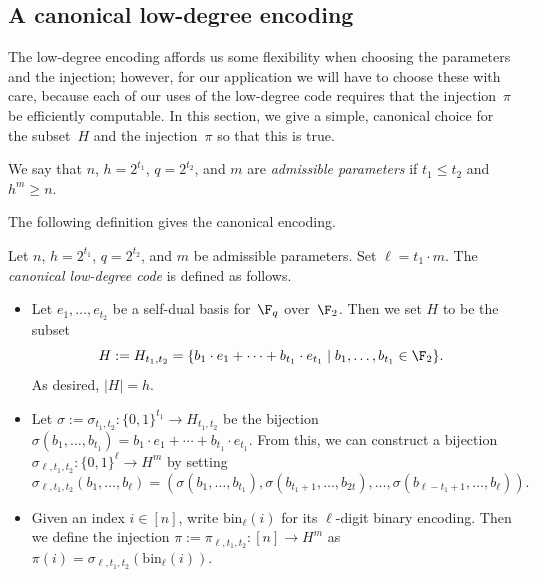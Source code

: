 \subsection{A canonical low-degree encoding}

The low-degree encoding affords us some flexibility when choosing the parameters and the injection;
however, for our application we will have to choose these with care,
because each of our uses of the low-degree code requires that the injection~$\pi$ be efficiently computable.
In this section, we give a simple, canonical choice for the subset~$H$ and the injection~$\pi$ so that this is true.

\begin{definition}\label{def:admissible-prelims}
We say that
$n$,
$h= 2^{t_1}$,
$q = 2^{t_2}$,
and $m$
are \emph{admissible parameters} if $t_1 \leq t_2$ and $h^m\geq n$.
\end{definition}

The following definition gives the canonical encoding.

\begin{definition}\label{def:canonical-low-degree}
Let $n$, $h = 2^{t_1}$, $q= 2^{t_2}$, and $m$ be admissible parameters.
Set $\ell = t_1 \cdot m$.
The \emph{canonical low-degree code} is defined as follows.
\begin{itemize}
\item[(i)] Let $e_1, \ldots, e_{t_2}$ be a self-dual basis for~$\F_q$ over~$\F_2$. Then we set $H$ to be the subset
	\begin{equation*}
		H:= H_{t_1, t_2} = \{b_1 \cdot e_1 + \cdots + b_{t_1} \cdot e_{t_1} \mid b_1, \ldots, b_{t_1} \in \F_2\}.
	\end{equation*}
	As desired, $|H| = h$.
\item[(ii)] Let $\sigma:= \sigma_{t_1, t_2}: \{0, 1\}^{t_1} \rightarrow H_{t_1, t_2}$ be the bijection $\sigma(b_1, \ldots, b_{t_1}) = b_1 \cdot e_1 + \cdots + b_{t_1} \cdot e_{t_1}$.
	From this, we can construct a bijection $\sigma_{\ell, t_1, t_2} : \{0, 1\}^\ell \rightarrow H^m$ by setting
	\begin{equation*}
		\sigma_{\ell, t_1, t_2}(b_1, \ldots, b_\ell) = (\sigma(b_1, \ldots, b_{t_1}), \sigma(b_{t_1+1}, \ldots, b_{2t}), \ldots, \sigma(b_{\ell-t_1+1}, \ldots, b_{\ell})).
	\end{equation*}
\item[(iii)] Given an index $i \in [n]$, write $\mathrm{bin}_\ell(i)$ for its $\ell$-digit binary encoding. 
	Then we define the injection $\pi:=\pi_{\ell, t_1, t_2}:[n] \rightarrow H^m$ as $\pi(i) = \sigma_{\ell, t_1, t_2}(\mathrm{bin}_\ell(i))$.
\end{itemize}
\end{definition}

